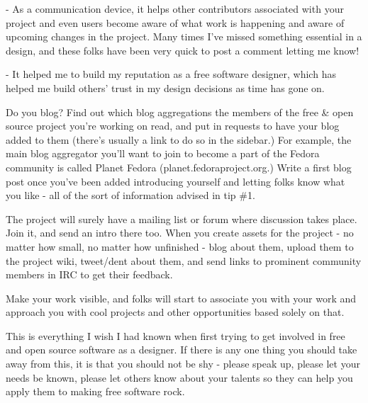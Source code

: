 - As a communication device, it helps other contributors associated with your
project and even users become aware of what work is happening and aware of
upcoming changes in the project. Many times I've missed something essential in a
design, and these folks have been very quick to post a comment letting me know!

- It helped me to build my reputation as a free software designer, which has
helped me build others' trust in my design decisions as time has gone on. 

Do you blog? Find out which blog aggregations the members of the free \& open
source project you're working on read, and put in requests to have your blog
added to them (there's usually a link to do so in the sidebar.) For example, the
main blog aggregator you'll want to join to become a part of the Fedora
community is called Planet Fedora (planet.fedoraproject.org.) Write a first blog
post once you've been added introducing yourself and letting folks know what you
like - all of the sort of information advised in tip \#1.

The project will surely have a mailing list or forum where discussion takes
place. Join it, and send an intro there too. When you create assets for the
project - no matter how small, no matter how unfinished - blog about them,
upload them to the project wiki, tweet/dent about them, and send links to
prominent community members in IRC to get their feedback.

Make your work visible, and folks will start to associate you with your work and
approach you with cool projects and other opportunities based solely on that.


This is everything I wish I had known when first trying to get involved in free
and open source software as a designer. If there is any one thing you should
take away from this, it is that you should not be shy - please speak up, please
let your needs be known, please let others know about your talents so they can
help you apply them to making free software rock.

